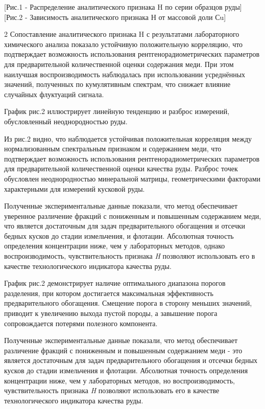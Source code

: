 \begin{figs}
    [Рис.1 - Распределение аналитического признака H по серии
образцов руды]
    [Рис.2 - Зависимость аналитического признака Н от массовой доли Сu]
\end{figs}

\begin{multicols}{2}
Сопоставление аналитического признака H с результатами лабораторного
химического анализа показало устойчивую положительную корреляцию, что
подтверждает возможность использования рентгенорадиометрических
параметров для предварительной количественной оценки содержания меди.
При этом наилучшая воспроизводимость наблюдалась при использовании
усреднённых значений, полученных по кумулятивным спектрам, что снижает
влияние случайных флуктуаций сигнала.

График рис.2 иллюстрирует линейную тенденцию и разброс измерений,
обусловленный неоднородностью руды.

Из рис.2 видно, что наблюдается устойчивая положительная корреляция
между нормализованным спектральным признаком и содержанием меди, что
подтверждает возможность использования рентгенорадиометрических
параметров для предварительной количественной оценки качества руды.
Разброс точек обусловлен неоднородностью минеральной матрицы,
геометрическими факторами характерными для измерений кусковой руды.

Полученные экспериментальные данные показали, что метод обеспечивает
уверенное различение фракций с пониженным и повышенным содержанием меди,
что является достаточным для задач предварительного обогащения и отсечки
бедных кусков до стадии измельчения, и флотации. Абсолютная точность
определения концентрации ниже, чем у лабораторных методов, однако
воспроизводимость, чувствительность признака \emph{H} позволяют
использовать его в качестве технологического индикатора качества руды.

График рис.2 демонстрирует наличие оптимального диапазона порогов
разделения, при котором достигается максимальная эффективность
предварительного обогащения. Смещение порога в сторону меньших значений,
приводит к увеличению выхода пустой породы, а завышение порога
сопровождается потерями полезного компонента.

Полученные экспериментальные данные показали, что метод обеспечивает
различение фракций с пониженным и повышенным содержанием меди - это
является достаточным для задач предварительного обогащения и отсечки
бедных кусков до стадии измельчения и флотации. Абсолютная точность
определения концентрации ниже, чем у лабораторных методов, но
воспроизводимость, чувствительность признака \emph{H} позволяют
использовать его в качестве технологического индикатора качества руды.


\end{multicols}
